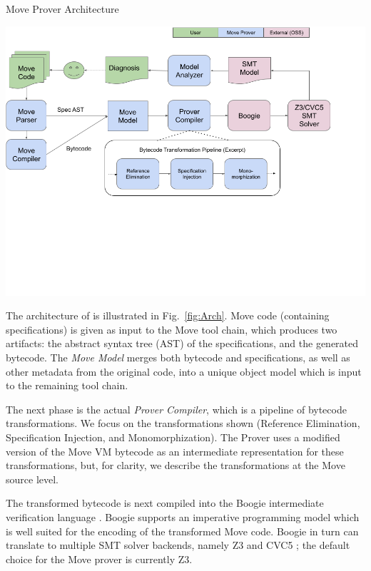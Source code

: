 
\begin{Figure}
  \centering
  \caption{Move Prover Architecture}
  \label{fig:Arch}
  \includegraphics[trim=0 250 0 0, width=\textwidth]{arch.png}
\end{Figure}


The architecture of \MVP is illustrated in Fig.~\ref{fig:Arch}. Move code
(containing specifications) is given as input to the Move tool chain, which
produces two artifacts: the abstract syntax tree (AST) of the specifications,
and the generated bytecode.  The \emph{Move Model} merges both bytecode and
specifications, as well as other metadata from the original code, into a unique
object model which is input to the remaining tool chain.

The next phase is the actual \emph{Prover Compiler}, which is a
pipeline of bytecode transformations. We focus on the
transformations shown (Reference Elimination, Specification Injection, and
Monomorphization).
The Prover uses a modified version of the Move VM bytecode as an intermediate
representation for these transformations, but, for clarity,
we describe the transformations at the Move source level.

The transformed bytecode is next compiled into the Boogie intermediate
verification language \cite{BOOGIE}. Boogie supports an imperative programming
model which is well suited for the encoding of the transformed Move code. Boogie
in turn can translate to multiple SMT solver backends, namely Z3 \cite{Z3} and
CVC5 \cite{CVC}; the default choice for the Move prover is currently Z3.

